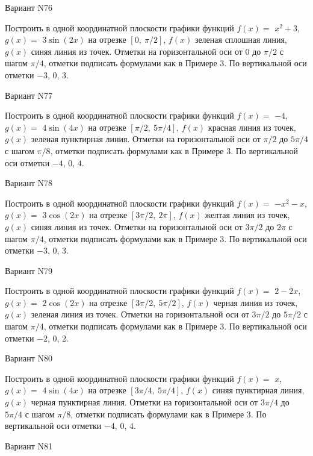 \documentclass[11pt]{report}
\begin{document}
Вариант N76

Построить в одной координатной плоскости графики функций $f(x) = $
    $x^{2} + 3$, $g(x) = $
    $3 \sin{\left(2 x \right)}$ на 
    отрезке $\left[ 0, \  \pi / 2\right]$, $f(x)$ зеленая 
    сплошная линия, $g(x)$ синяя линия из точек. 
    Отметки на горизонтальной оси от $0$ до $\pi / 2$ с 
    шагом $\pi / 4$, отметки подписать формулами как в Примере 3.  
    По вертикальной оси отметки $-3$, 0, $3$.

Вариант N77

Построить в одной координатной плоскости графики функций $f(x) = $
    $-4$, $g(x) = $
    $4 \sin{\left(4 x \right)}$ на 
    отрезке $\left[ \pi / 2, \  5 \pi / 4\right]$, $f(x)$ красная 
    линия из точек, $g(x)$ зеленая пунктирная линия. 
    Отметки на горизонтальной оси от $\pi / 2$ до $5 \pi / 4$ с 
    шагом $\pi / 8$, отметки подписать формулами как в Примере 3.  
    По вертикальной оси отметки $-4$, 0, $4$.

Вариант N78

Построить в одной координатной плоскости графики функций $f(x) = $
    $- x^{2} - x$, $g(x) = $
    $3 \cos{\left(2 x \right)}$ на 
    отрезке $\left[ 3 \pi / 2, \  2 \pi\right]$, $f(x)$ желтая 
    линия из точек, $g(x)$ синяя линия из точек. 
    Отметки на горизонтальной оси от $3 \pi / 2$ до $2 \pi$ с 
    шагом $\pi / 4$, отметки подписать формулами как в Примере 3.  
    По вертикальной оси отметки $-3$, 0, $3$.

Вариант N79

Построить в одной координатной плоскости графики функций $f(x) = $
    $2 - 2 x$, $g(x) = $
    $2 \cos{\left(2 x \right)}$ на 
    отрезке $\left[ 3 \pi / 2, \  5 \pi / 2\right]$, $f(x)$ черная 
    линия из точек, $g(x)$ зеленая линия из точек. 
    Отметки на горизонтальной оси от $3 \pi / 2$ до $5 \pi / 2$ с 
    шагом $\pi / 4$, отметки подписать формулами как в Примере 3.  
    По вертикальной оси отметки $-2$, 0, $2$.

Вариант N80

Построить в одной координатной плоскости графики функций $f(x) = $
    $x$, $g(x) = $
    $4 \sin{\left(4 x \right)}$ на 
    отрезке $\left[ 3 \pi / 4, \  5 \pi / 4\right]$, $f(x)$ синяя 
    пунктирная линия, $g(x)$ черная пунктирная линия. 
    Отметки на горизонтальной оси от $3 \pi / 4$ до $5 \pi / 4$ с 
    шагом $\pi / 8$, отметки подписать формулами как в Примере 3.  
    По вертикальной оси отметки $-4$, 0, $4$.

Вариант N81
\end{document}
